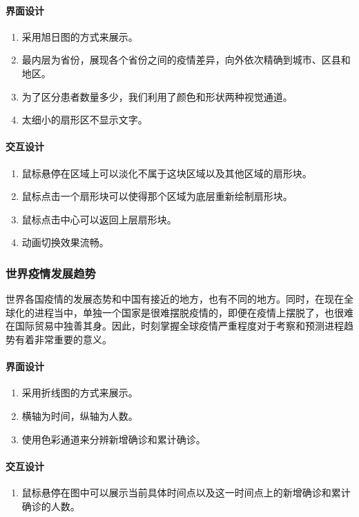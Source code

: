 \documentclass{ctexart}
\begin{document}
\paragraph{界面设计}
\begin{enumerate}
    \item 采用旭日图的方式来展示。
    \item 最内层为省份，展现各个省份之间的疫情差异，向外依次精确到城市、区县和地区。
    \item 为了区分患者数量多少，我们利用了颜色和形状两种视觉通道。
    \item 太细小的扇形区不显示文字。
\end{enumerate}

\paragraph{交互设计}
\begin{enumerate}
\item 鼠标悬停在区域上可以淡化不属于这块区域以及其他区域的扇形块。
\item 鼠标点击一个扇形块可以使得那个区域为底层重新绘制扇形块。
\item 鼠标点击中心可以返回上层扇形块。
\item 动画切换效果流畅。
\end{enumerate}

\subsubsection{世界疫情发展趋势}
世界各国疫情的发展态势和中国有接近的地方，也有不同的地方。同时，在现在全球化的进程当中，单独一个国家是很难摆脱疫情的，即便在疫情上摆脱了，也很难在国际贸易中独善其身。因此，时刻掌握全球疫情严重程度对于考察和预测进程趋势有着非常重要的意义。

\paragraph{界面设计}
\begin{enumerate}
    \item 采用折线图的方式来展示。
    \item 横轴为时间，纵轴为人数。
    \item 使用色彩通道来分辨新增确诊和累计确诊。
\end{enumerate}

\paragraph{交互设计}
\begin{enumerate}
\item 鼠标悬停在图中可以展示当前具体时间点以及这一时间点上的新增确诊和累计确诊的人数。
\end{enumerate}
\end{document}
